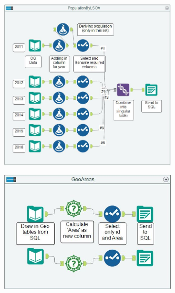 \documentclass{article}
\begin{document}
\begin{itemize}
\begin{figure}
\begin{subfigure}[t]{0.5\linewidth}
		\end{subfigure}
  	\end{figure}
  	\begin{figure}
  		\begin{subfigure}[b]{0.5\linewidth}
  			\centering
			\includegraphics[width=\linewidth]{images/Alteryx_PopulationLSOA.JPG}
		\end{subfigure}
		\begin{subfigure}[b]{0.5\linewidth}
  			\centering
			\includegraphics[width=\linewidth]{images/Alteryx_GeoAreas.JPG}
		\end{subfigure}

\end{figure}
\end{itemize}
\end{document}
